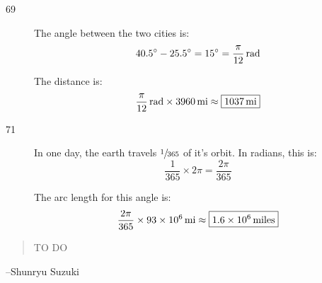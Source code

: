 \documentclass{exam}
\newcommand{\degree}{\ensuremath{^\circ}}
\begin{document}
\begin{description}
      \item[69]
        The angle between the two cities is: 
        \[
          40.5 \degree - 25.5 \degree = 15 \degree = \unit[ \frac{\pi}{12} ]{rad}
        \]

        The distance is:
        \[
          \unit[ \frac{\pi}{12} ]{rad} \times \unit[3960]{mi} \approx \boxed{ \unit[ 1037 ]{mi} }
        \]

      \item[71]
        In one day, the earth travels $\sfrac{1}{365}$ of it's orbit.  In radians, this is:
        \[
          \frac{1}{365} \times 2 \pi = \frac{2 \pi}{365}
        \]

        The arc length for this angle is:
        \[
          \frac{2 \pi}{365} \times \unit[ 93 \times 10^6 ]{mi} \approx \boxed{ \unit[1.6 \times 10^6]{miles} }
        \]


    \end{description}

  \else
    \vspace{1 cm}
    \begin{quote}
      \begin{em}
        TO DO
      \end{em}
    \end{quote}
    \hspace{1 cm} --Shunryu Suzuki
  \fi
\end{document}
